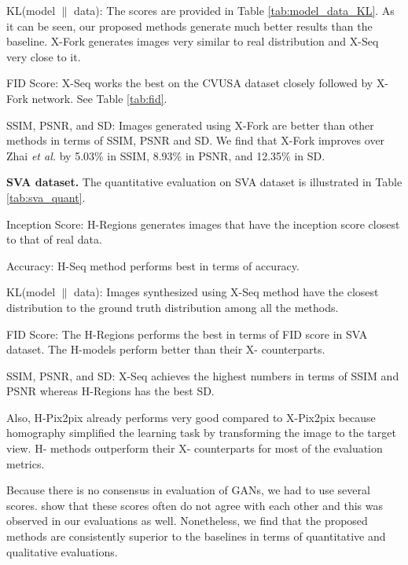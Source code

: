 \documentclass[times,twocolumn,final,authoryear]{elsarticle_modified}
\begin{document}
KL(model $\|$ data):
The scores are provided in Table \ref{tab:model_data_KL}. As it can be seen, our proposed methods generate much better results than the baseline. X-Fork generates images very similar to real distribution and X-Seq very close to it. 

{FID Score:} X-Seq works the best on the CVUSA dataset closely followed by X-Fork network. See Table \ref{tab:fid}.

{SSIM, PSNR, and SD:} Images generated using X-Fork are better than other methods in terms of SSIM, PSNR and SD. We find that X-Fork improves over Zhai \textit{et al.} by 5.03\% in SSIM, 8.93\% in PSNR, and 12.35\% in SD. 



\noindent \textbf{SVA dataset.} The quantitative evaluation on SVA dataset is illustrated in Table \ref{tab:sva_quant}.

Inception Score: H-Regions generates images that have the inception score closest to that of real data.


Accuracy: 
H-Seq method performs best in terms of accuracy.

KL(model $\|$ data):
Images synthesized using X-Seq method have the closest distribution to the ground truth distribution among all the methods.

{FID Score:} The H-Regions performs the best in terms of FID score in SVA dataset. The H-models perform better than their X- counterparts.

{SSIM, PSNR, and SD:}
X-Seq achieves the highest numbers in terms of SSIM and PSNR whereas H-Regions has the best SD.


Also, H-Pix2pix already performs very good compared to X-Pix2pix because homography simplified the learning task by transforming the image to the target view. H- methods outperform their X- counterparts for most of the evaluation metrics.

Because there is no consensus in evaluation of GANs, we had to use several scores. \cite{Theis2016a} show that these scores often do not agree with each other and this was observed in our evaluations as well. Nonetheless, we find that the proposed methods are consistently superior to the baselines in terms of quantitative and qualitative evaluations. 
\end{document}
